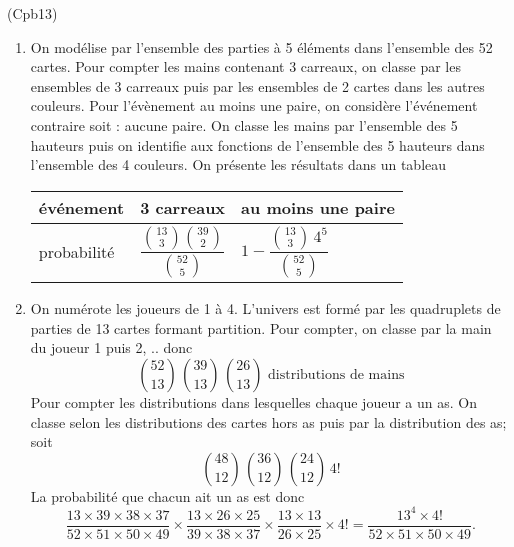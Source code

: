 \begin{tiny}(Cpb13)\end{tiny} 
\begin{enumerate}
  \item On modélise par l'ensemble des parties à 5 éléments dans l'ensemble des 52 cartes.\newline
Pour compter les mains contenant 3 carreaux, on classe par les ensembles de 3 carreaux puis par les ensembles de 2 cartes dans les autres couleurs.\newline
Pour l'évènement \og au moins une paire\fg, on considère l'événement contraire soit : \og aucune paire\fg. On classe les mains par l'ensemble des 5 hauteurs puis on identifie aux fonctions de l'ensemble des 5 hauteurs dans l'ensemble des 4 couleurs. On présente les résultats dans un tableau
\begin{center}
\renewcommand{\arraystretch}{2.5}
\begin{tabular}{l|l|l}
événement   & 3 carreaux                                        & au moins une paire\\ \hline 
probabilité & $\dfrac{\binom{13}{3}\binom{39}{2}}{\binom{52}{5}}$ & $1 - \dfrac{\binom{13}{3}\, 4^5}{\binom{52}{5}}$
\end{tabular}
\end{center}
  \item On numérote les joueurs de 1 à 4. L'univers est formé par les quadruplets de parties  de 13 cartes formant partition. Pour compter, on classe par la main du joueur 1 puis 2, .. donc
\[
  \binom{52}{13}\, \binom{39}{13}\,\binom{26}{13} \text{ distributions de mains}
\]
Pour compter les distributions dans lesquelles chaque joueur a un as. On classe selon les distributions des cartes hors as puis par la distribution des as; soit 
\[
  \binom{48}{12}\, \binom{36}{12}\,\binom{24}{12}\, 4!
\]
La probabilité que chacun ait un as est donc
\[
  \frac{13\times 39 \times 38 \times 37}{52\times 51 \times 50 \times 49}
  \times
  \frac{13\times 26 \times 25}{39\times 38 \times 37}
  \times
  \frac{13\times 13}{26\times 25} \times 4!
  = \frac{13^4 \times 4!}{52\times 51 \times 50 \times 49}.
\]

\end{enumerate}

